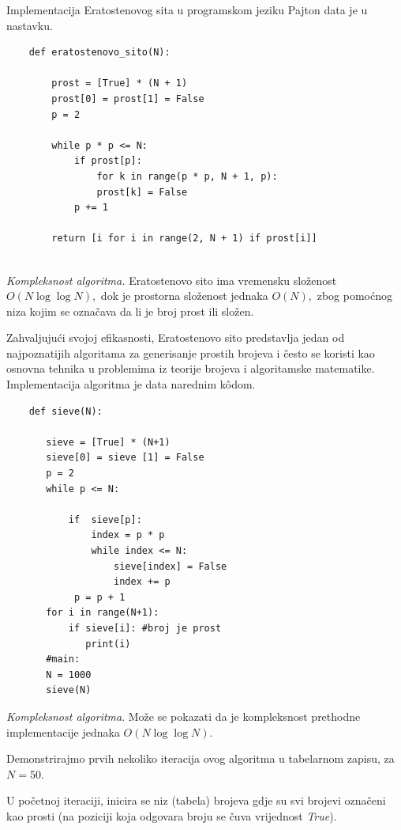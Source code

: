 \medskip

Implementacija Eratostenovog sita u programskom jeziku Pajton data je u nastavku.

\begin{verbatim}
	def eratostenovo_sito(N):
	
	    prost = [True] * (N + 1)
	    prost[0] = prost[1] = False
	    p = 2
	
	    while p * p <= N:
	        if prost[p]:
	            for k in range(p * p, N + 1, p):
	            prost[k] = False
	        p += 1
	
	    return [i for i in range(2, N + 1) if prost[i]]
	
\end{verbatim}

\textit{Kompleksnost algoritma.} Eratostenovo sito ima vremensku složenost $O(N \log \log N),$ dok je prostorna složenost jednaka $O(N),$ zbog pomoćnog niza kojim se označava da li je broj prost ili složen.

Zahvaljujući svojoj efikasnosti, Eratostenovo sito predstavlja jedan od najpoznatijih algoritama za generisanje prostih brojeva i često se koristi kao osnovna tehnika u problemima iz teorije brojeva i algoritamske matematike. Implementacija algoritma je data narednim k\^odom. 

\begin{verbatim}
	def sieve(N):
	   
	   sieve = [True] * (N+1)
	   sieve[0] = sieve [1] = False
	   p = 2   
	   while p <= N:
	       
	       if  sieve[p]:
	           index = p * p
	           while index <= N:
	               sieve[index] = False
	               index += p   
	        p = p + 1
	   for i in range(N+1):
	       if sieve[i]: #broj je prost
	          print(i)
       #main:
       N = 1000
       sieve(N)
\end{verbatim}  
\textit{Kompleksnost algoritma}.  Može se pokazati da je kompleksnost prethodne implementacije jednaka $O(N \log\log N )$. 


Demonstrirajmo   prvih nekoliko iteracija ovog algoritma u tabelarnom zapisu, za $N=50.$ 

U početnoj iteraciji, inicira se niz (tabela) brojeva gdje su svi brojevi označeni kao prosti (na poziciji koja odgovara broju se čuva vrijednost \emph{True}).


